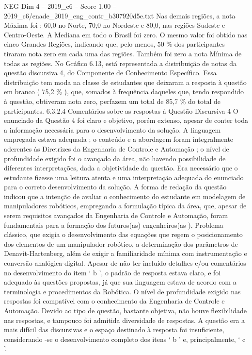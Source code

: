 \begin{textsample}{NEG Dim 4 – 2019\_c6 – Score 1.00 – 2019\_c6/enade\_2019\_eng\_contr\_b307920d5e.txt}
Nas demais regiões, a nota Máxima foi : 60,0 no Norte, 70,0 no Nordeste e 80,0, nas regiões Sudeste e Centro-Oeste.
A Mediana em todo o Brasil foi zero.
O mesmo valor foi obtido nas cinco Grandes Regiões, indicando que, pelo menos, 50 \% dos participantes tiraram nota zero em cada uma das regiões.
Também foi zero a nota Mínima de todas as regiões.
No Gráfico 6.13, está representada a distribuição de notas da questão discursiva 4, do Componente de Conhecimento Específico.
Essa distribuição tem moda na classe de estudantes que deixaram a resposta à questão em branco ( 75,2 \% ), que, somados à frequência daqueles que, tendo respondido à questão, obtiveram nota zero, perfazem um total de 85,7 \% do total de participantes. 6.3.2.4 Comentários sobre as respostas à Questão Discursiva 4 O enunciado da Questão 4 foi claro e objetivo, porém extenso, apesar de conter toda a informação necessária para o desenvolvimento da solução.
A linguagem empregada estava adequada ; o conteúdo e a abordagem foram integralmente aderentes às Diretrizes da Engenharia de Controle e Automação ; o nível de profundidade exigido foi o avançado da área, não havendo possibilidade de diferentes interpretações, dada a objetividade da questão.
Era necessário que o estudante fizesse uma leitura atenta e uma interpretação adequada do enunciado para o correto desenvolvimento da solução.
A forma de redação da questão indicou que a intenção de avaliar o conhecimento do estudante em modelagem de manipuladores robóticos, empregando a formulação típica da área, que, apesar de serem requisitos avançados da Engenharia de Controle e Automação, foram fundamentais para a formação dos futuros(as) engenheiros(as ).
Problema clássico, que exigia o desenvolvimento das equações que regem o posicionamento dos elementos de um manipulador robótico, a determinação dos parâmetros de Denavit-Hartenberg, além de exigir a familiaridade mínima com instrumentação e conversão analógica-digital.
Apesar de não ter incluído detalhes e/ou comentários no desenvolvimento do item ‘ b ’, o padrão de resposta estava claro, e foi adequado às questões propostas, já que sua linguagem estava de acordo com a terminologia e procedimentos da Robótica.
O nível de profundidade exigido nas respostas foi compatível com o conhecimento da Engenharia de Controle e Automação.
Devido ao tipo de questão, bastante objetiva, não houve flexibilidade nas respostas, e tampouco foi admitida diversidade de respostas.
A questão era a mais difícil das discursivas e o espaço destinado à resposta foi insuficiente, considerando -se o desenvolvimento completo dos itens ‘ b ’ e, principalmente, ‘ c ’.

\end{textsample}
